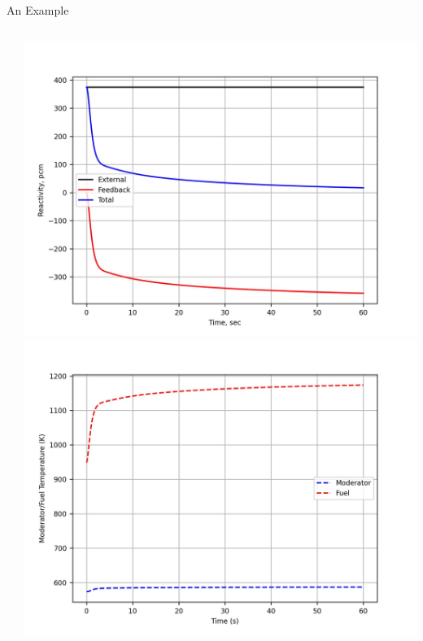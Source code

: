 \documentclass[10pt,compress]{beamer}
\begin{document}
\begin{frame}{An Example}
\begin{columns}
\begin{column}{5cm}
        \end{column}
        \begin{column}{5cm}
            \includegraphics[width=0.9\linewidth]{images/reactivityCase1.jpg}
            \includegraphics[width=0.9\linewidth]{images/tempsCase1.jpg}
        \end{column}
    \end{columns}
\end{frame}
\end{document}

